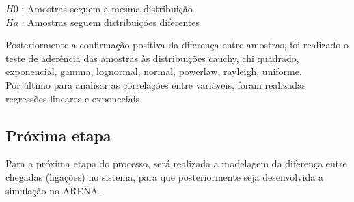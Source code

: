 \begin{center}
$H{0}$ : Amostras seguem a mesma distribuição\\
$H{a}$ : Amostras seguem distribuições diferentes
\end{center}
Posteriormente a confirmação positiva da diferença entre amostras, foi realizado o teste de aderência das amostras às distribuições cauchy, chi quadrado, exponencial, gamma, lognormal, normal, powerlaw, rayleigh, uniforme.\\
Por último para analisar as correlações entre variáveis, foram realizadas regressões lineares e exponeciais.\\

\subsection{Próxima etapa}
Para a próxima etapa do processo, será realizada a modelagem da diferença entre chegadas (ligações) no sistema, para que posteriormente seja desenvolvida a simulação no ARENA.